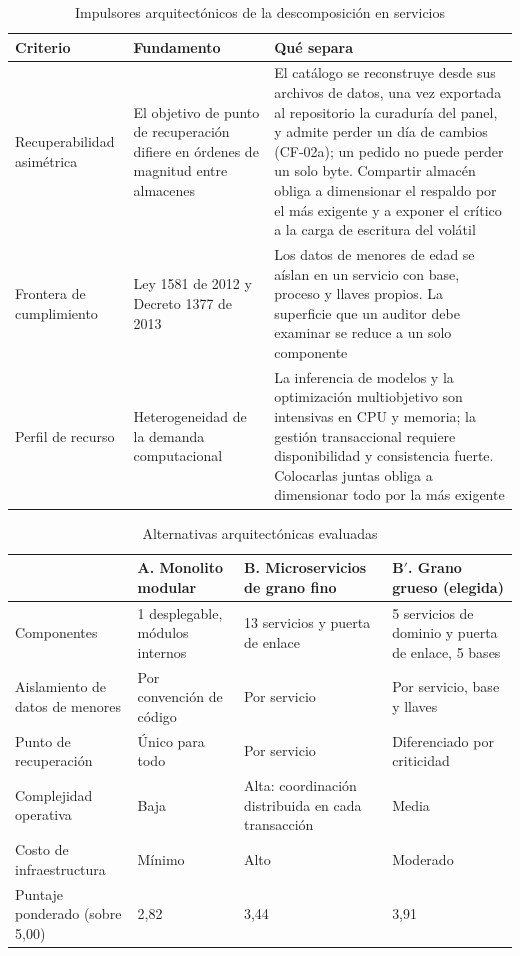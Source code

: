 \begin{table}[htbp]
\centering
\caption{Impulsores arquitectónicos de la descomposición en servicios}
\label{tab:impulsores-anexo}
\small
\begin{tabular}{@{}p{3.1cm}p{5.0cm}p{5.6cm}@{}}
\toprule
\textbf{Criterio} & \textbf{Fundamento} & \textbf{Qué separa} \\
\midrule
Recuperabilidad asimétrica &
El objetivo de punto de recuperación difiere en órdenes de magnitud entre almacenes &
El catálogo se reconstruye desde sus archivos de datos, una vez exportada al repositorio la
curaduría del panel, y admite perder un día de cambios (CF-02a); un pedido no puede perder un
solo byte. Compartir almacén obliga a dimensionar el
respaldo por el más exigente y a exponer el crítico a la carga de escritura del volátil \\
\addlinespace
Frontera de cumplimiento &
Ley 1581 de 2012 \citep{congreso_ley1581_2012} y Decreto 1377 de 2013
\citep{presidencia_decreto1377_2013} &
Los datos de menores de edad se aíslan en un servicio con base, proceso y llaves propios.
La superficie que un auditor debe examinar se reduce a un solo componente \\
\addlinespace
Perfil de recurso &
Heterogeneidad de la demanda computacional &
La inferencia de modelos y la optimización multiobjetivo son intensivas en CPU y memoria;
la gestión transaccional requiere disponibilidad y consistencia fuerte. Colocarlas juntas
obliga a dimensionar todo por la más exigente \\
\bottomrule
\end{tabular}
\end{table}

\begin{table}[htbp]
\centering
\caption{Alternativas arquitectónicas evaluadas}
\label{tab:alternativas-anexo}
\small
\begin{tabular}{@{}p{2.6cm}p{3.5cm}p{3.5cm}p{4.1cm}@{}}
\toprule
& \textbf{A. Monolito modular} & \textbf{B. Microservicios de grano fino} & \textbf{B$'$. Grano grueso (elegida)} \\
\midrule
Componentes & 1 desplegable, módulos internos & 13 servicios y puerta de enlace & 5 servicios de dominio y puerta de enlace, 5 bases \\
\addlinespace
Aislamiento de datos de menores & Por convención de código & Por servicio & Por servicio, base y llaves \\
\addlinespace
Punto de recuperación & Único para todo & Por servicio & Diferenciado por criticidad \\
\addlinespace
Complejidad operativa & Baja & Alta: coordinación distribuida en cada transacción & Media \\
\addlinespace
Costo de infraestructura & Mínimo & Alto & Moderado \\
\addlinespace
Puntaje ponderado (sobre 5,00) & 2,82 & 3,44 & 3,91 \\
\bottomrule
\end{tabular}
\end{table}

